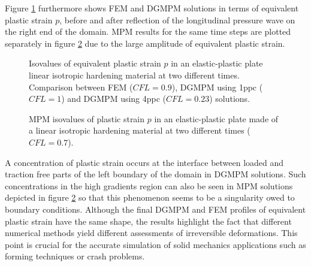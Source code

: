 Figure \ref{fig:2dEP_comparison} furthermore shows FEM and DGMPM solutions in terms of equivalent plastic strain $p$, before and after reflection of the longitudinal pressure wave on the right end of the domain.
MPM results for the same time steps are plotted separately in figure \ref{fig:2dEP_mpm} due to the large amplitude of equivalent plastic strain.
\begin{figure}[h!]
  \centering
  
  \caption{Isovalues of equivalent plastic strain $p$ in an elastic-plastic plate linear isotropic hardening material at two different times. Comparison between FEM ($CFL=0.9$), DGMPM using 1ppc ($CFL=1$) and DGMPM using 4ppc ($CFL=0.23$) solutions.}
  \label{fig:2dEP_comparison}
\end{figure}
\begin{figure}[h!]
  \centering
  
  \caption{MPM isovalues of plastic strain $p$ in an elastic-plastic plate made of a linear isotropic hardening material at two different times ($CFL=0.7$).}
  \label{fig:2dEP_mpm}
\end{figure}
A concentration of plastic strain occurs at the interface between loaded and traction free parts of the left boundary of the domain in DGMPM solutions. 
Such concentrations in the high gradients region can also be seen in MPM solutions depicted in figure \ref{fig:2dEP_mpm} so that this phenomenon seems to be a singularity owed to boundary conditions.
Although the final DGMPM and FEM profiles of equivalent plastic strain have the same shape, the results highlight the fact that different numerical methods yield different assessments of irreversible deformations.
This point is crucial for the accurate simulation of solid mechanics applications such as forming techniques or crash problems.




